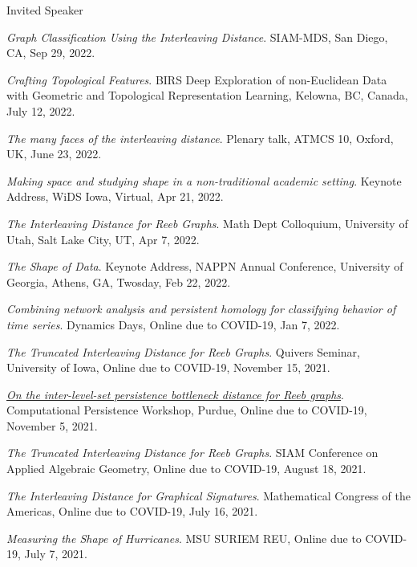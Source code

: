 \documentclass{resume} %
\begin{document}
\begin{rSection}{Invited Speaker}
\begin{etaremune}
\item\emph{Graph Classification Using the Interleaving Distance}. SIAM-MDS, San Diego, CA, Sep 29, 2022. 

\item\emph{Crafting Topological Features}. BIRS Deep Exploration of non-Euclidean Data with Geometric and Topological Representation Learning, Kelowna, BC, Canada, July 12, 2022. 

\item\emph{The many faces of the interleaving distance}. Plenary talk, ATMCS 10, Oxford, UK, June 23, 2022. 

\item\emph{Making space and studying shape in a non-traditional academic setting}. Keynote Address, WiDS Iowa, Virtual, Apr 21, 2022. 

\item\emph{The Interleaving Distance for Reeb Graphs}. Math Dept Colloquium, University of Utah, Salt Lake City, UT, Apr 7, 2022. 

\item\emph{The Shape of Data}. Keynote Address, NAPPN Annual Conference, University of Georgia, Athens, GA, Twosday, Feb 22, 2022. 

\item\emph{Combining network analysis and persistent homology for classifying behavior of time series}. Dynamics Days, Online due to COVID-19, Jan 7, 2022. 

\item\emph{The Truncated Interleaving Distance for Reeb Graphs}. Quivers Seminar, University of Iowa, Online due to COVID-19, November 15, 2021. 

\item\emph{\href{https://drive.google.com/file/d/1lnZ_g1aQBkX4W6F9SRovgQ8Bzih1Is97/view?usp=sharing}{On the inter-level-set persistence bottleneck distance for Reeb graphs}}. Computational Persistence Workshop, Purdue, Online due to COVID-19, November 5, 2021. 

\item\emph{The Truncated Interleaving Distance for Reeb Graphs}. SIAM Conference on Applied Algebraic Geometry, Online due to COVID-19, August 18, 2021. 

\item\emph{The Interleaving Distance for Graphical Signatures}. Mathematical Congress of the Americas, Online due to COVID-19, July 16, 2021. 

\item\emph{Measuring the Shape of Hurricanes}. MSU SURIEM REU, Online due to COVID-19, July 7, 2021. 


\end{etaremune}
\end{rSection}
\end{document}
